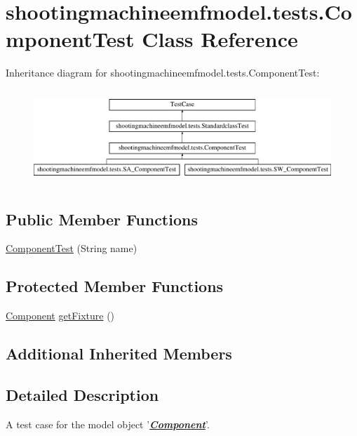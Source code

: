 \hypertarget{classshootingmachineemfmodel_1_1tests_1_1_component_test}{\section{shootingmachineemfmodel.\-tests.\-Component\-Test Class Reference}
\label{classshootingmachineemfmodel_1_1tests_1_1_component_test}
}
Inheritance diagram for shootingmachineemfmodel.\-tests.\-Component\-Test\-:\begin{figure}[H]
\begin{center}
\leavevmode
\includegraphics[height=3.589744cm]{classshootingmachineemfmodel_1_1tests_1_1_component_test}
\end{center}
\end{figure}
\subsection*{Public Member Functions}
\begin{DoxyCompactItemize}
\item 
\hyperlink{classshootingmachineemfmodel_1_1tests_1_1_component_test_ad1bc86251003337cd4c5af4419480579}{Component\-Test} (String name)
\end{DoxyCompactItemize}
\subsection*{Protected Member Functions}
\begin{DoxyCompactItemize}
\item 
\hyperlink{interfaceshootingmachineemfmodel_1_1_component}{Component} \hyperlink{classshootingmachineemfmodel_1_1tests_1_1_component_test_a267b0c586f529f310782399fac87abf5}{get\-Fixture} ()
\end{DoxyCompactItemize}
\subsection*{Additional Inherited Members}


\subsection{Detailed Description}
A test case for the model object '{\itshape {\bfseries \hyperlink{interfaceshootingmachineemfmodel_1_1_component}{Component}}}'.

